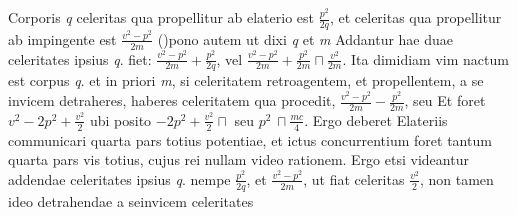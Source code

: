 %
Corporis \textit{q} celeritas%
\protect{} qua propellitur ab elaterio%
\protect{} est $\displaystyle\frac{p^2}{2q}$,
et %
celeritas\protect{} qua propellitur ab impingente est 
$\displaystyle\frac{v^2-p^2}{2m}$ 
%
(\protect\vphantom)pono autem ut dixi \textit{q} et \textit{m} 
%
%
 Addantur hae duae celeritates%
\protect{}
ipsius 
\textit{q}. fiet: $\displaystyle\frac{v^2-p^2}{2m}+\frac{p^2}{2q}$, vel $\displaystyle\frac{v^2-p^2}{2m} + \frac{p^2}{2m} \sqcap \frac{v^2}{2m}$. Ita dimidiam vim%
\protect{} nactum est corpus \textit{q}. et in
priori \textit{m}, si celeritatem retroagentem, et propellentem, a se invicem detraheres, haberes celeritatem%
\protect{} qua procedit,
$\displaystyle\frac{v^2-p^2}{2m} - \frac{p^2}{2m}$, seu 
Et 
  {}
foret $\displaystyle v^2-2p^2+\frac{v^2}{2}$
ubi posito 
$\displaystyle -2p^2+\frac{v^2}{2}\sqcap$
%
{}
%
seu $\displaystyle p^2\, \sqcap \frac{mc}{4}$. Ergo deberet Elateriis%
\protect{} communicari 
quarta pars totius potentiae,%
\protect{} et ictus concurrentium foret tantum quarta pars vis%
\protect{} totius, cujus rei nullam video
rationem. Ergo etsi videantur addendae celeritates ipsius \textit{q}. nempe $\displaystyle\frac{p^2}{2q}$, et $\displaystyle\frac{v^2-p^2}{2m}$, ut fiat celeritas
%
%
$\displaystyle\frac{v^2}{2}$, non tamen ideo detrahendae a seinvicem celeritates%
\protect{} 
%
